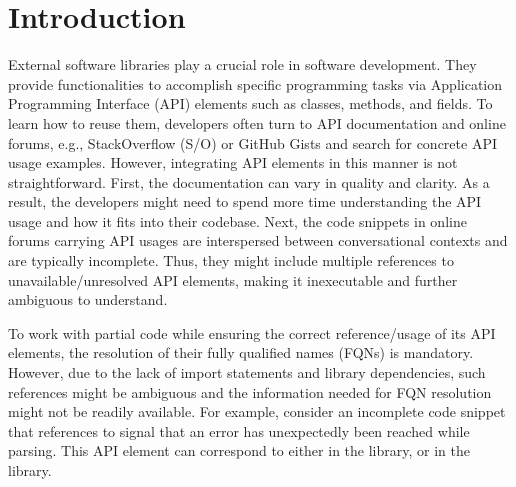 \section{Introduction}
\label{sec:intro}

External software libraries play a crucial role in software development. They provide functionalities to accomplish specific programming tasks via Application Programming Interface (API) elements such as classes, methods, and fields. To learn how to reuse them, developers often turn to API documentation and online forums, e.g., StackOverflow (S/O) or GitHub Gists and search for concrete API usage examples. However, integrating API elements in this manner is not straightforward. First, the documentation can vary in quality and clarity. As a result, the developers might need to spend more time understanding the API usage and how it fits into their codebase. Next, the code snippets in online forums carrying API usages are interspersed between conversational contexts and are typically incomplete. Thus, they might include multiple references to unavailable/unresolved API elements, making it inexecutable and further ambiguous to understand.

To work with partial code while ensuring the correct reference/usage of its API elements, the resolution of their fully qualified names (FQNs) is mandatory. However, due to the lack of import statements and library dependencies, such references might be ambiguous and the information needed for FQN resolution might not be readily available. For example, consider an incomplete code snippet that references  to signal that an error has unexpectedly been reached while parsing. This API element can correspond to either  in the  library, or  in the  library.

